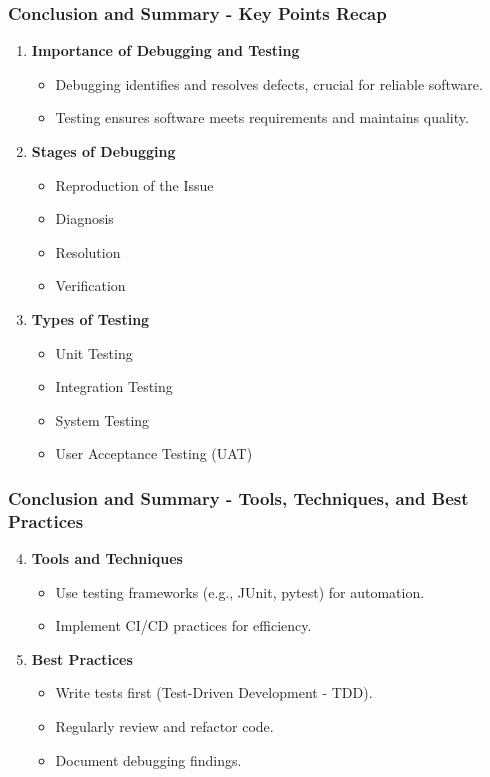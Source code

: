 \documentclass{beamer}
\begin{document}
\begin{frame}[fragile]
    \frametitle{Conclusion and Summary - Key Points Recap}
    \begin{enumerate}
        \item \textbf{Importance of Debugging and Testing}
        \begin{itemize}
            \item Debugging identifies and resolves defects, crucial for reliable software.
            \item Testing ensures software meets requirements and maintains quality.
        \end{itemize}
        \item \textbf{Stages of Debugging}
        \begin{itemize}
            \item Reproduction of the Issue
            \item Diagnosis
            \item Resolution
            \item Verification
        \end{itemize}
        \item \textbf{Types of Testing}
        \begin{itemize}
            \item Unit Testing
            \item Integration Testing
            \item System Testing
            \item User Acceptance Testing (UAT)
        \end{itemize}
    \end{enumerate}
\end{frame}

\begin{frame}[fragile]
    \frametitle{Conclusion and Summary - Tools, Techniques, and Best Practices}
    \begin{enumerate}
        \setcounter{enumi}{3}
        \item \textbf{Tools and Techniques}
        \begin{itemize}
            \item Use testing frameworks (e.g., JUnit, pytest) for automation.
            \item Implement CI/CD practices for efficiency.
        \end{itemize}
        \item \textbf{Best Practices}
        \begin{itemize}
            \item Write tests first (Test-Driven Development - TDD).
            \item Regularly review and refactor code.
            \item Document debugging findings.
        \end{itemize}
    \end{enumerate}
\end{frame}
\end{document}
